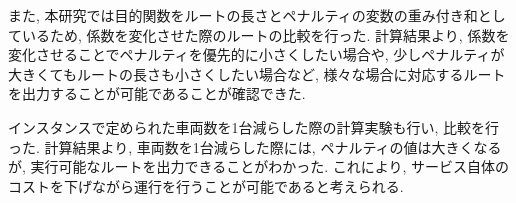 また, 本研究では目的関数をルートの長さとペナルティの変数の重み付き和としているため, 係数を変化させた際のルートの比較を行った. 計算結果より, 係数を変化させることでペナルティを優先的に小さくしたい場合や, 少しペナルティが大きくてもルートの長さも小さくしたい場合など, 様々な場合に対応するルートを出力することが可能であることが確認できた.

インスタンスで定められた車両数を1台減らした際の計算実験も行い, 比較を行った. 計算結果より, 車両数を1台減らした際には, ペナルティの値は大きくなるが, 実行可能なルートを出力できることがわかった. これにより, サービス自体のコストを下げながら運行を行うことが可能であると考えられる.
